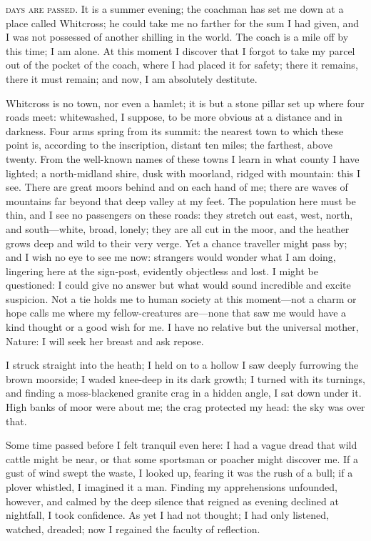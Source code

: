 
 \textsc{days are passed.} It is a summer evening; the coachman has set me
down at a place called Whitcross; he could take me no farther for the
sum I had given, and I was not possessed of another shilling in the
world. The coach is a mile off by this time; I am alone. At this
moment I discover that I forgot to take my parcel out of the pocket of
the coach, where I had placed it for safety; there it remains, there it
must remain; and now, I am absolutely destitute.

Whitcross is no town, nor even a hamlet; it is but a stone pillar set up
where four roads meet: whitewashed, I suppose, to be more obvious at a
distance and in darkness. Four arms spring from its summit: the nearest
town to which these point is, according to the inscription, distant ten
miles; the farthest, above twenty. From the well-known names of these
towns I learn in what county I have lighted; a north-midland shire, dusk
with moorland, ridged with mountain: this I see. There are great moors
behind and on each hand of me; there are waves of mountains far beyond
that deep valley at my feet. The population here must be thin, and I
see no passengers on these roads: they stretch out east, west, north,
and south---white, broad, lonely; they are all cut in the moor, and the
heather grows deep and wild to their very verge. Yet a chance traveller
might pass by; and I wish no eye to see me now: strangers would wonder
what I am doing, lingering here at the sign-post, evidently objectless
and lost. I might be questioned: I could give no answer but what would
sound incredible and excite suspicion. Not a tie holds me to human
society at this moment---not a charm or hope calls me where my
fellow-creatures are---none that saw me would have a kind thought or a
good wish for me. I have no relative but the universal mother, Nature:
I will seek her breast and ask repose.

I struck straight into the heath; I held on to a hollow I saw deeply
furrowing the brown moorside; I waded knee-deep in its dark growth; I
turned with its turnings, and finding a moss-blackened granite crag in a
hidden angle, I sat down under it. High banks of moor were about me;
the crag protected my head: the sky was over that.

Some time passed before I felt tranquil even here: I had a vague dread
that wild cattle might be near, or that some sportsman or poacher might
discover me. If a gust of wind swept the waste, I looked up, fearing it
was the rush of a bull; if a plover whistled, I imagined it a man.
Finding my apprehensions unfounded, however, and calmed by the deep
silence that reigned as evening declined at nightfall, I took
confidence. As yet I had not thought; I had only listened, watched,
dreaded; now I regained the faculty of reflection.

